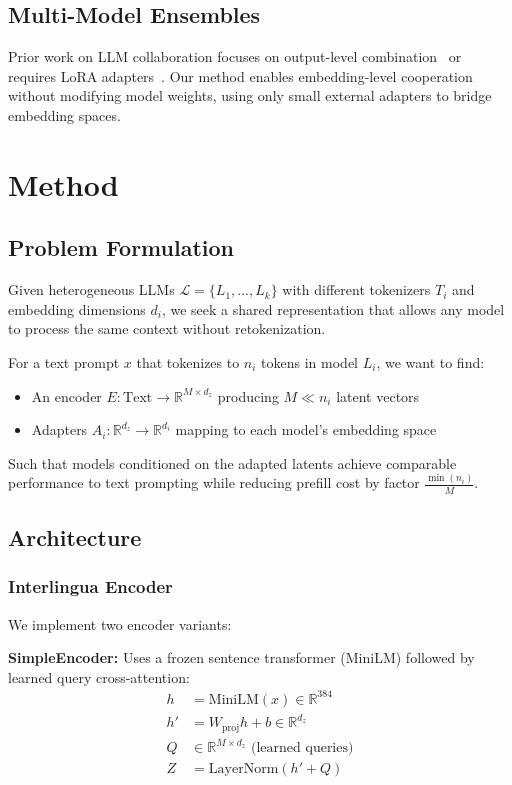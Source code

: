 \documentclass{article}
\begin{document}
\subsection{Multi-Model Ensembles}

Prior work on LLM collaboration focuses on output-level combination~\cite{april2024deepen,june2024moa} or requires LoRA adapters~\cite{hu2021lora}. Our method enables embedding-level cooperation without modifying model weights, using only small external adapters to bridge embedding spaces.

\section{Method}

\subsection{Problem Formulation}

Given heterogeneous LLMs $\mathcal{L} = \{L_1, ..., L_k\}$ with different tokenizers $T_i$ and embedding dimensions $d_i$, we seek a shared representation that allows any model to process the same context without retokenization. 

For a text prompt $x$ that tokenizes to $n_i$ tokens in model $L_i$, we want to find:
\begin{itemize}
\item An encoder $E: \text{Text} \rightarrow \mathbb{R}^{M \times d_z}$ producing $M \ll n_i$ latent vectors
\item Adapters $A_i: \mathbb{R}^{d_z} \rightarrow \mathbb{R}^{d_i}$ mapping to each model's embedding space
\end{itemize}

Such that models conditioned on the adapted latents achieve comparable performance to text prompting while reducing prefill cost by factor $\frac{\min(n_i)}{M}$.

\subsection{Architecture}

\subsubsection{Interlingua Encoder}

We implement two encoder variants:

\textbf{SimpleEncoder:} Uses a frozen sentence transformer (MiniLM) followed by learned query cross-attention:
\begin{align}
h &= \text{MiniLM}(x) \in \mathbb{R}^{384} \\
h' &= W_{\text{proj}} h + b \in \mathbb{R}^{d_z} \\
Q &\in \mathbb{R}^{M \times d_z} \text{ (learned queries)} \\
Z &= \text{LayerNorm}(h' + Q)
\end{align}
\end{document}
